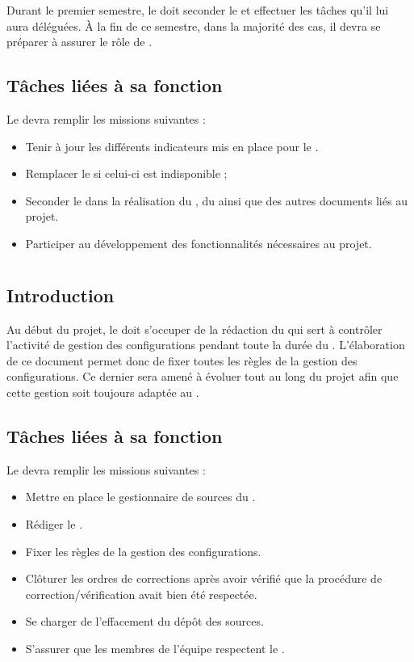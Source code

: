 Durant le premier semestre, le \RQA{} doit seconder le \RQ{} et effectuer les tâches qu’il lui aura déléguées. À la fin de ce semestre, dans la majorité des cas, il devra se préparer à assurer le rôle de \RQ .

\subsection*{Tâches liées à sa fonction}

Le \RQA{} devra remplir les missions suivantes :
\begin{itemize}
	\item Tenir à jour les différents indicateurs mis en place pour le \PICCourt.
	\item Remplacer le \RQA{} si celui-ci est indisponible ;
	\item Seconder le \RQ{} dans la réalisation du \PQ, du \PGC{} ainsi que des autres documents liés au projet.
        \item Participer au développement des fonctionnalités nécessaires au projet. 
\end{itemize}

\newpage
\section{\RGC}
\subsection*{Introduction}

Au début du projet, le \RGC{} doit s'occuper de la rédaction du \PGCCourt{} qui sert à contrôler l’activité de gestion des configurations pendant toute la durée du \PICCourt. L’élaboration de ce document permet donc de fixer toutes les règles de la gestion des configurations. Ce dernier sera amené à évoluer tout au long du projet afin que cette gestion soit toujours adaptée au \PICCourt.

\subsection*{Tâches liées à sa fonction}

Le \RGC{} devra remplir les missions suivantes :
\begin{itemize}
	\item Mettre en place le gestionnaire de sources du \PICCourt.
	\item Rédiger le \PGC.
	\item Fixer les règles de la gestion des configurations.
        \item Clôturer les ordres de corrections après avoir vérifié que la procédure de correction/vérification avait bien été respectée.
        \item Se charger de l'effacement du dépôt des sources.
        \item S'assurer que les membres de l'équipe \PICCourt{} respectent le \PGCCourt.
\end{itemize}

